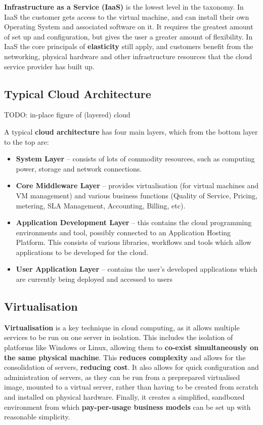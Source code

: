 \documentclass{article}
\begin{document}
\textbf{Infrastructure as a Service (IaaS)} is the lowest level in the taxonomy. In IaaS the customer gets access to the virtual machine, and can install their own Operating System and associated software on it. It requires the greatest amount of set up and configuration, but gives the user a greater amount of flexibility. In IaaS the core principals of \textbf{elasticity} still apply, and customers benefit from the networking, physical hardware and other infrastructure resources that the cloud service provider has built up. 

\subsection{Typical Cloud Architecture}

TODO: in-place figure of (layered) cloud

A typical \textbf{cloud architecture} has four main layers, which from the bottom layer to the top are:
\begin{itemize}
	\item \textbf{System Layer} -- consists of lots of commodity resources, such as computing power, storage and network connections.
	\item \textbf{Core Middleware Layer} -- provides virtualisation (for virtual machines and VM management) and various business functions (Quality of Service, Pricing, metering, SLA Management, Accounting, Billing, etc).
	\item \textbf{Application Development Layer} -- this contains the cloud programming environments and tool, possibly connected to an Application Hosting Platform. This consists of various libraries, workflows and tools which allow applications to be developed for the cloud. 
	\item \textbf{User Application Layer} -- contains the user's developed applications which are currently being deployed and accessed to users
\end{itemize}


\subsection{Virtualisation}

\textbf{Virtualisation} is a key technique in cloud computing, as it allows multiple services to be run on one server in isolation. This includes the isolation of platforms like Windows or Linux, allowing them to \textbf{co-exist simultaneously on the same physical machine}. This \textbf{reduces complexity} and allows for the consolidation of servers, \textbf{reducing cost}. It also allows for quick configuration and administration of servers, as they can be run from a preprepared virtualised image, mounted to a virtual server, rather than having to be created from scratch and installed on physical hardware. Finally, it creates a simplified, sandboxed environment from which \textbf{pay-per-usage business models} can be set up with reasonable simplicity. 
\end{document}
